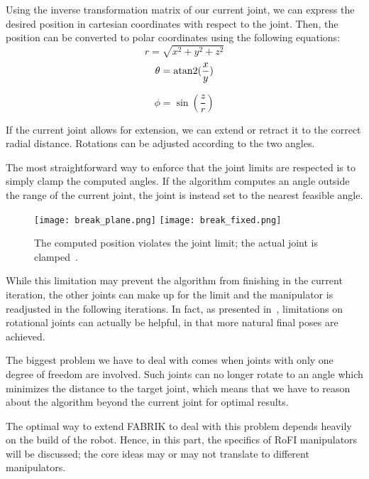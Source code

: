 Using the inverse transformation matrix of our current joint, we can express the desired position in cartesian coordinates with respect to the joint. Then, the position can be converted to polar coordinates using the following equations:
\begin{equation}
  r = \sqrt{x^2 + y^2 + z^2}
\end{equation}
\begin{equation}
  \theta = \operatorname{atan2}(\frac{x}{y})
\end{equation}

\begin{equation}
  \phi = \sin(\frac{z}{r})
\end{equation}

If the current joint allows for extension, we can extend or retract it to the correct radial distance. Rotations can be adjusted according to the two angles.

The most straightforward way to enforce that the joint limits are respected is to simply clamp the computed angles. If the algorithm computes an angle outside the range of the current joint,
the joint is instead set to the nearest feasible angle.

\begin{figure}[h]
    \centering
    \begin{minipage}{\textwidth}
        \texttt{[image: break\_plane.png]}
        \texttt{[image: break\_fixed.png]}
    \end{minipage}
    \caption{The computed position violates the joint limit; the actual joint is clamped~\cite{Ondika2021thesis}.}\label{fig:break}
\end{figure}

While this limitation may prevent the algorithm from finishing in the current iteration, the other joints can make up for the limit and the manipulator is readjusted in the following iterations. In fact, as presented in~\cite{fabrik}, limitations on rotational joints can actually be helpful, in that more natural final poses are achieved.

The biggest problem we have to deal with comes when joints with only one degree of freedom are involved. Such joints can no longer rotate to an angle which minimizes the distance to the target joint, which means that we have to reason about the algorithm beyond the current joint for optimal results.

The optimal way to extend FABRIK to deal with this problem depends heavily on the build of the robot. Hence, in this part, the specifics of RoFI manipulators will be discussed; the core ideas may or may not translate to different manipulators.

